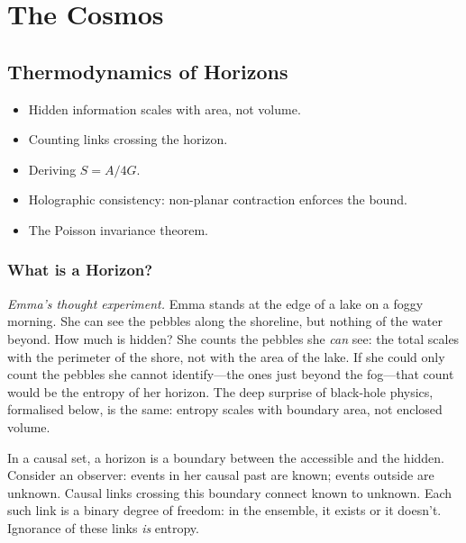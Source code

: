 \documentclass[11pt, a4paper, openany]{book}
\newenvironment{introduction}[1][Modulo Overview]{%
  \begin{tcolorbox}[
    enhanced,colback=structure!5,colframe=structure,
    colbacktitle=structure,coltitle=white,
    fonttitle=\small\bfseries,title={#1},
    arc=2pt,boxrule=0.7pt,
    left=8pt,right=8pt,top=6pt,bottom=6pt,
    before skip=12pt,after skip=12pt
  ]\itshape\begin{itemize}[leftmargin=*,itemsep=2pt,parsep=0pt]
}{%
  \end{itemize}\end{tcolorbox}
}
\begin{document}
\part{The Cosmos}

\chapter{Thermodynamics of Horizons}\label{ch:horizons}

\begin{introduction}
  \item Hidden information scales with area, not volume.
  \item Counting links crossing the horizon.
  \item Deriving $S = A/4G$.
  \item Holographic consistency: non-planar contraction enforces the bound.
  \item The Poisson invariance theorem.
\end{introduction}

\section{What is a Horizon?}

\smallskip\noindent
\textit{Emma's thought experiment.}
Emma stands at the edge of a lake on a foggy morning. She can see the
pebbles along the shoreline, but nothing of the water beyond. How much
is hidden? She counts the pebbles she \emph{can} see: the total scales
with the perimeter of the shore, not with the area of the lake. If she
could only count the pebbles she cannot identify---the ones just beyond
the fog---that count would be the entropy of her horizon. The deep
surprise of black-hole physics, formalised below, is the same: entropy
scales with boundary area, not enclosed volume.
\smallskip

\noindent
In a causal set, a horizon is a boundary between the accessible and the
hidden. Consider an observer: events in her causal past are known; events
outside are unknown. Causal links crossing this boundary connect known to
unknown. Each such link is a binary degree of freedom: in the ensemble,
it exists or it doesn't. Ignorance of these links \emph{is} entropy.
\end{document}
